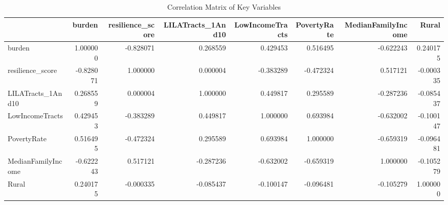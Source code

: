 \begin{table}
\caption{Correlation Matrix of Key Variables}
\begin{tabular}{lrrrrrrr}
\toprule
 & burden & resilience_score & LILATracts_1And10 & LowIncomeTracts & PovertyRate & MedianFamilyIncome & Rural \\
\midrule
burden & 1.000000 & -0.828071 & 0.268559 & 0.429453 & 0.516495 & -0.622243 & 0.240175 \\
resilience_score & -0.828071 & 1.000000 & 0.000004 & -0.383289 & -0.472324 & 0.517121 & -0.000335 \\
LILATracts_1And10 & 0.268559 & 0.000004 & 1.000000 & 0.449817 & 0.295589 & -0.287236 & -0.085437 \\
LowIncomeTracts & 0.429453 & -0.383289 & 0.449817 & 1.000000 & 0.693984 & -0.632002 & -0.100147 \\
PovertyRate & 0.516495 & -0.472324 & 0.295589 & 0.693984 & 1.000000 & -0.659319 & -0.096481 \\
MedianFamilyIncome & -0.622243 & 0.517121 & -0.287236 & -0.632002 & -0.659319 & 1.000000 & -0.105279 \\
Rural & 0.240175 & -0.000335 & -0.085437 & -0.100147 & -0.096481 & -0.105279 & 1.000000 \\
\bottomrule
\end{tabular}
\end{table}
